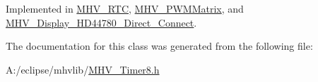 \-Implemented in \hyperlink{class_m_h_v___r_t_c_a949570f89977560cc68dc909e7d0a805}{\-M\-H\-V\-\_\-\-R\-T\-C}, \hyperlink{class_m_h_v___p_w_m_matrix_a15a8c45e7736a53cb2e19a7c2070bb0d}{\-M\-H\-V\-\_\-\-P\-W\-M\-Matrix}, and \hyperlink{class_m_h_v___display___h_d44780___direct___connect_afde566730348a32f1699e92d2e887240}{\-M\-H\-V\-\_\-\-Display\-\_\-\-H\-D44780\-\_\-\-Direct\-\_\-\-Connect}.



\-The documentation for this class was generated from the following file\-:\begin{DoxyCompactItemize}
\item 
\-A\-:/eclipse/mhvlib/\hyperlink{_m_h_v___timer8_8h}{\-M\-H\-V\-\_\-\-Timer8.\-h}\end{DoxyCompactItemize}
